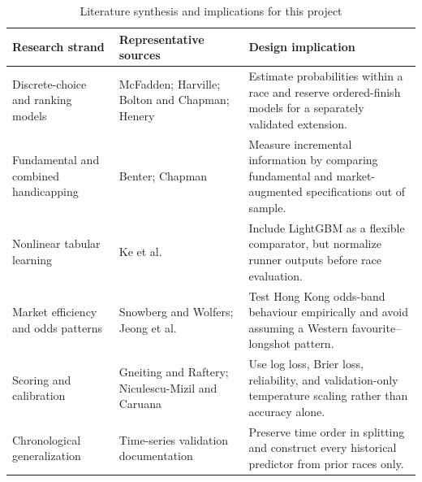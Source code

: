 \begin{table}[htbp]
\centering
\caption{Literature synthesis and implications for this project}\label{tab:lit-synthesis}
\small
\begin{tabularx}{\textwidth}{L{3.5cm} L{4.4cm} Y}
\toprule
\textbf{Research strand} & \textbf{Representative sources} & \textbf{Design implication} \\
\midrule
Discrete-choice and ranking models & McFadden; Harville; Bolton and Chapman; Henery\cite{mcfadden1974,harville1973,bolton1986,henery1981} & Estimate probabilities within a race and reserve ordered-finish models for a separately validated extension. \\
\addlinespace
Fundamental and combined handicapping & Benter; Chapman\cite{benter1994,chapman1994} & Measure incremental information by comparing fundamental and market-augmented specifications out of sample. \\
\addlinespace
Nonlinear tabular learning & Ke et al.\cite{ke2017lightgbm} & Include LightGBM as a flexible comparator, but normalize runner outputs before race evaluation. \\
\addlinespace
Market efficiency and odds patterns & Snowberg and Wolfers; Jeong et al.\cite{snowbergwolfers2010,jeong2019} & Test Hong Kong odds-band behaviour empirically and avoid assuming a Western favourite--longshot pattern. \\
\addlinespace
Scoring and calibration & Gneiting and Raftery; Niculescu-Mizil and Caruana\cite{gneiting2007,niculescu2005} & Use log loss, Brier loss, reliability, and validation-only temperature scaling rather than accuracy alone. \\
\addlinespace
Chronological generalization & Time-series validation documentation\cite{sklearn_timesplit} & Preserve time order in splitting and construct every historical predictor from prior races only. \\
\bottomrule
\end{tabularx}
\end{table}
